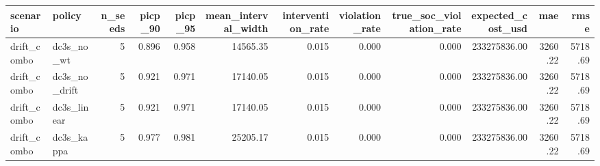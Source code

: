 \begin{tabular}{llrrrrrrrrrr}
\toprule
scenario & policy & n\_seeds & picp\_90 & picp\_95 & mean\_interval\_width & intervention\_rate & violation\_rate & true\_soc\_violation\_rate & expected\_cost\_usd & mae & rmse \\
\midrule
drift\_combo & dc3s\_no\_wt & 5 & 0.896 & 0.958 & 14565.35 & 0.015 & 0.000 & 0.000 & 233275836.00 & 3260.22 & 5718.69 \\
drift\_combo & dc3s\_no\_drift & 5 & 0.921 & 0.971 & 17140.05 & 0.015 & 0.000 & 0.000 & 233275836.00 & 3260.22 & 5718.69 \\
drift\_combo & dc3s\_linear & 5 & 0.921 & 0.971 & 17140.05 & 0.015 & 0.000 & 0.000 & 233275836.00 & 3260.22 & 5718.69 \\
drift\_combo & dc3s\_kappa & 5 & 0.977 & 0.981 & 25205.17 & 0.015 & 0.000 & 0.000 & 233275836.00 & 3260.22 & 5718.69 \\
\bottomrule
\end{tabular}
